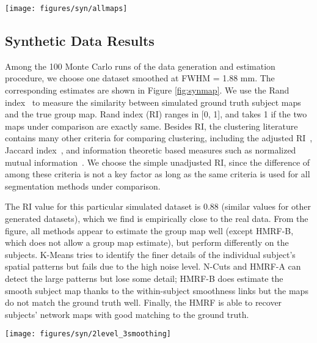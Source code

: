 \documentclass[review,authoryear]{elsarticle}
\begin{document}
\begin{figure*}[htb]
  \centering
  \texttt{[image: figures/syn/allmaps]}
  \caption{The estimated group and subject functional network label maps from
    various methods, as well as the ground truth maps. Only two are shown among
    the 25 subjects. }
  \label{fig:synmap}
\end{figure*}

\subsection{Synthetic Data Results}
Among the 100 Monte Carlo runs of the data generation and estimation procedure,
we choose one dataset smoothed at FWHM = 1.88 mm. The corresponding estimates
are shown in Figure \ref{fig:synmap}. We use the Rand
index~\citep{rand1971objective} to measure the similarity between simulated
ground truth subject maps and the true group map. Rand index (RI) ranges in [0,
  1], and takes 1 if the two maps under comparison are exactly same.  Besides
RI, the clustering literature contains many other criteria for comparing
clustering, including the adjusted RI~\citep{hubert1985comparing}, Jaccard
index~\citep{ben2001stability}, and information theoretic based measures such as
normalized mutual information~\citep{vinh2009information}. We choose the simple
unadjusted RI, since the difference of among these criteria is not a key factor
as long as the same criteria is used for all segmentation methods under
comparison.

The RI value for this particular simulated dataset is 0.88 (similar values for
other generated datasets), which we find is empirically close to the real data.
From the figure, all methods appear to estimate the group map well (except
HMRF-B, which does not allow a group map estimate), but perform differently on
the subjects. K-Means tries to identify the finer details of the individual
subject's spatial patterns but fails due to the high noise level. N-Cuts and
HMRF-A can detect the large patterns but lose some detail; HMRF-B does estimate
the smooth subject map thanks to the within-subject smoothness links but the
maps do not match the ground truth well. Finally, the HMRF is able to recover
subjects' network maps with good matching to the ground truth.


\begin{figure*}[htb]
  \centering
  \texttt{[image: figures/syn/2level\_3smoothing]}
  \caption{Box-and-whiskers plots of the estimation accuracies of all methods
    for three levels of spatial smoothing. The top row is the accuracies of
    subject labels across all subjects and MC samples, and the bottom is group
    map accuracies across all MC samples. The upper and lower 'hinges'
    correspond to the $25$th and $75$th percentiles. The asterisk on top of each
    box indicates the p-value of the standard two-tailed T test between HMRF and
    the corresponding method. No asterisk: significant $p > 0.05$; $*$:
    significant at $p < 0.05$; $**$: significant at $p < 0.01$; ${***}$:
    significant at $p < 0.001$. The group map is not applicable to \emph{HMRF-B}
    due to its lack of between-level links.}
  \label{fig:synboxplot}
\end{figure*}
\end{document}
